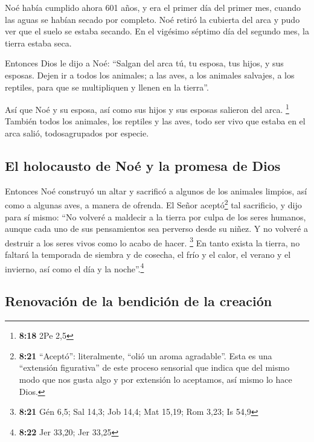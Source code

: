  Noé había cumplido ahora 601 años, y era el primer día
del primer mes, cuando las aguas se habían secado por completo. Noé
retiró la cubierta del arca y pudo ver que el suelo se estaba secando.
 En el vigésimo séptimo día del segundo mes, la tierra
estaba seca.

 Entonces Dios le dijo a Noé:  ``Salgan
del arca tú, tu esposa, tus hijos, y sus esposas.  Dejen
ir a todos los animales; a las aves, a los animales salvajes, a los
reptiles, para que se multipliquen y llenen en la tierra''.

 Así que Noé y su esposa, así como sus hijos y sus
esposas salieron del arca. \footnote{\textbf{8:18} 2Pe 2,5}
 También todos los animales, los reptiles y las aves,
todo ser vivo que estaba en el arca salió, todosagrupados por especie.

\hypertarget{el-holocausto-de-nouxe9-y-la-promesa-de-dios}{%
\subsection{El holocausto de Noé y la promesa de
Dios}\label{el-holocausto-de-nouxe9-y-la-promesa-de-dios}}

 Entonces Noé construyó un altar y sacrificó a algunos de
los animales limpios, así como a algunas aves, a manera de ofrenda.
 El Señor aceptó\footnote{\textbf{8:21} ``Aceptó'':
  literalmente, ``olió un aroma agradable''. Esta es una ``extensión
  figurativa'' de este proceso sensorial que indica que del mismo modo
  que nos gusta algo y por extensión lo aceptamos, así mismo lo hace
  Dios.} tal sacrificio, y dijo para sí mismo: ``No volveré a maldecir a
la tierra por culpa de los seres humanos, aunque cada uno de sus
pensamientos sea perverso desde su niñez. Y no volveré a destruir a los
seres vivos como lo acabo de hacer. \footnote{\textbf{8:21} Gén 6,5; Sal
  14,3; Job 14,4; Mat 15,19; Rom 3,23; Is 54,9}  En tanto
exista la tierra, no faltará la temporada de siembra y de cosecha, el
frío y el calor, el verano y el invierno, así como el día y la
noche''.\footnote{\textbf{8:22} Jer 33,20; Jer 33,25}

\hypertarget{renovaciuxf3n-de-la-bendiciuxf3n-de-la-creaciuxf3n}{%
\subsection{Renovación de la bendición de la
creación}\label{renovaciuxf3n-de-la-bendiciuxf3n-de-la-creaciuxf3n}}

